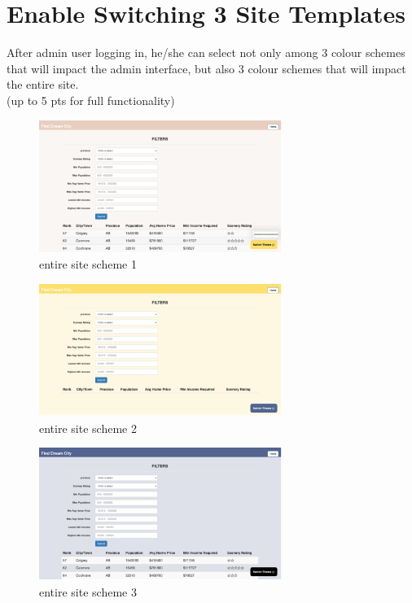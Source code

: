 \documentclass[12pt, letterpaper]{article}
\begin{document}
 \newpage

\section{Enable Switching 3 Site Templates}
After admin user logging in, he/she can select not only among 3 colour schemes that will impact the admin interface, but also 3 colour schemes that will impact the entire site. 
\\(up to 5 pts for full functionality)

\begin{figure}[htbp]
	\centering
	\includegraphics[width=3.1in]{images/q14-1.png}
	\caption{entire site scheme 1}
 \end{figure}
 
 \begin{figure}[htbp]
	\centering
	\includegraphics[width=3.1in]{images/q14-2png.png}
	\caption{entire site scheme 2}
 \end{figure}

\begin{figure}[htbp]
	\centering
	\includegraphics[width=3.1in]{images/q14-3.png}
	\caption{entire site scheme 3}
 \end{figure}
 \newpage
 
\end{document}
